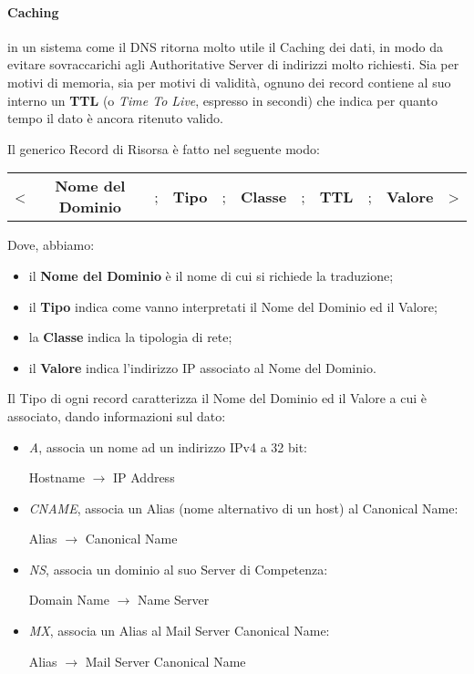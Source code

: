 \documentclass[a4paper]{article}
\begin{document}
			\paragraph{Caching}
				in un sistema come il DNS ritorna molto utile il Caching dei dati, in modo da evitare sovraccarichi agli Authoritative Server di indirizzi molto richiesti.
				Sia per motivi di memoria, sia per motivi di validità, ognuno dei record contiene al suo interno un \textbf{TTL} (o \emph{Time To Live}, espresso in secondi) che indica per quanto tempo il dato è ancora ritenuto valido.
				
				Il generico Record di Risorsa è fatto nel seguente modo:
				\begin{center}
					\begin{tabular}{ccccccccccc}
						< & \textbf{Nome del Dominio} & ; & \textbf{Tipo} & ; & \textbf{Classe} & ; & \textbf{TTL} & ; & \textbf{Valore} & > \\
					\end{tabular}
				\end{center}
				Dove, abbiamo:
				\begin{itemize}
					\item il \textbf{Nome del Dominio} è il nome di cui si richiede la traduzione;
					\item il \textbf{Tipo} indica come vanno interpretati il Nome del Dominio ed il Valore;
					\item la \textbf{Classe} indica la tipologia di rete;
					\item il \textbf{Valore} indica l'indirizzo IP associato al Nome del Dominio.
				\end{itemize}
				
				Il Tipo di ogni record caratterizza il Nome del Dominio ed il Valore a cui è associato, dando informazioni sul dato:
				\begin{itemize}
					\item \emph{A}, associa un nome ad un indirizzo IPv4 a 32 bit:
					\begin{center}											
						Hostname $ \rightarrow $ IP Address
					\end{center}
					\item \emph{CNAME}, associa un Alias (nome alternativo di un host) al Canonical Name:
					\begin{center}									
						Alias $ \rightarrow $ Canonical Name
					\end{center}
					\item \emph{NS}, associa un dominio al suo Server di Competenza:
					\begin{center}									
						Domain Name $ \rightarrow $ Name Server
					\end{center}
					\item \emph{MX}, associa un Alias al Mail Server Canonical Name:
					\begin{center}									
						Alias $ \rightarrow $ Mail Server Canonical Name
					\end{center}
				\end{itemize}
				
\end{document}
